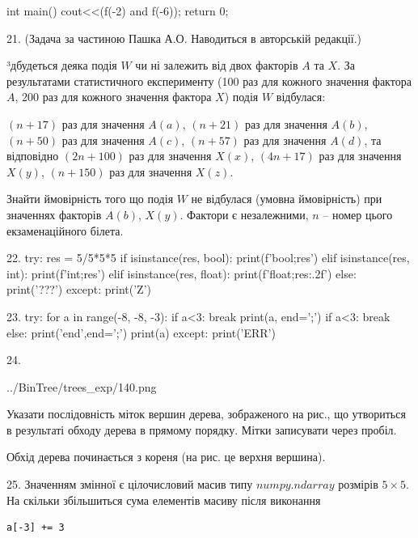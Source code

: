 \documentclass[11pt]{article}
\begin{document}
int main(){
    cout<<(f(-2) and f(-6));
    return 0;
}

21. 
(Задача за частиною Пашка А.О. Наводиться в авторській редакції.)\par {\hspace {0.5 cm}}³дбудеться деяка подія $W$ чи ні залежить від двох факторів $A$ та $X$. За результатами статистичного експерименту (100 раз для кожного значення фактора $A$,  200 раз для кожного значення фактора $X$) подія $W$ відбулася:\par {\hspace {0.5 cm}}$(n+17)$ раз для значення $A(a)$, $(n+21)$ раз для значення $A(b)$, $(n+50)$ раз для значення $A(c)$, $(n+57)$ раз для значення $A(d)$, та відповідно $(2n+100)$ раз для значення $X(x)$, $(4n+17)$ раз для значення $X(y)$, $(n+150)$ раз для значення $X(z)$.\par
{\hspace {0.5 cm}}Знайти ймовірність того що подія $W$ не відбулася (умовна ймовірність) при значеннях факторів $A(b)$, $X(y)$. Фактори є незалежними, $n$ – номер цього екзаменаційного білета.\par
22. 
try:
    res = 5/5*5*5
    if isinstance(res, bool):
        print(f'bool;{res}')
    elif isinstance(res, int):
        print(f'int;{res}')
    elif isinstance(res, float):
        print(f'float;{res:.2f}')
    else:
        print('???')
except:
    print('Z')

23. 
try:
    for a in range(-8, -8, -3):
        if a<3:
            break
        print(a, end=';')
        if a<3:
            break
    else:
        print('end',end=';')
    print(a)
except:
    print('ERR')

24. 

\begin{center}
	{../BinTree/trees_exp/140.png}
\end{center}
Указати послідовність міток вершин дерева, зображеного на рис., що утвориться в результаті обходу дерева в прямому порядку. Мітки записувати через пробіл.\par Обхід дерева починається з кореня (на рис. це верхня вершина).

25. 
Значенням змінної  є цілочисловий масив типу $numpy.ndarray$ розмірів $5{\times}5$. На скільки збільшиться сума елементів масиву  після виконання
\begin{verbatim}
a[-3] += 3
\end{verbatim}
\end{document}

